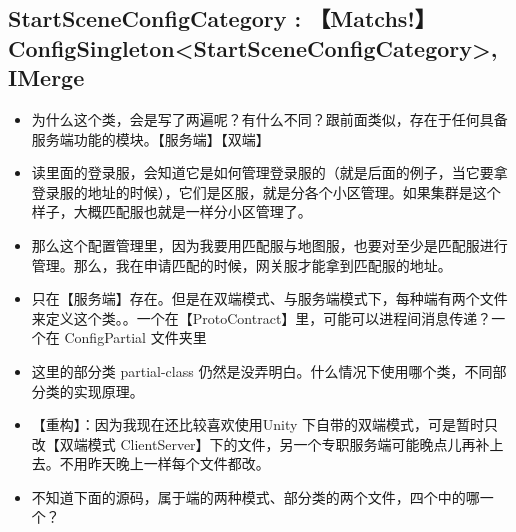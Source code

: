 \documentclass[9pt, b5paper]{article}
\begin{document}
\subsection{StartSceneConfigCategory : 【Matchs!】ConfigSingleton<StartSceneConfigCategory>, IMerge}
\label{sec-1-12}
\begin{itemize}
\item 为什么这个类，会是写了两遍呢？有什么不同？跟前面类似，存在于任何具备服务端功能的模块。【服务端】【双端】
\item 读里面的登录服，会知道它是如何管理登录服的（就是后面的例子，当它要拿登录服的地址的时候），它们是区服，就是分各个小区管理。如果集群是这个样子，大概匹配服也就是一样分小区管理了。
\item 那么这个配置管理里，因为我要用匹配服与地图服，也要对至少是匹配服进行管理。那么，我在申请匹配的时候，网关服才能拿到匹配服的地址。
\item 只在【服务端】存在。但是在双端模式、与服务端模式下，每种端有两个文件来定义这个类。。一个在【ProtoContract】里，可能可以进程间消息传递？一个在 ConfigPartial 文件夹里
\item 这里的部分类 partial-class 仍然是没弄明白。什么情况下使用哪个类，不同部分类的实现原理。
\item 【重构】：因为我现在还比较喜欢使用Unity 下自带的双端模式，可是暂时只改【双端模式 ClientServer】下的文件，另一个专职服务端可能晚点儿再补上去。不用昨天晚上一样每个文件都改。
\item 不知道下面的源码，属于端的两种模式、部分类的两个文件，四个中的哪一个？
\end{itemize}
\end{document}
